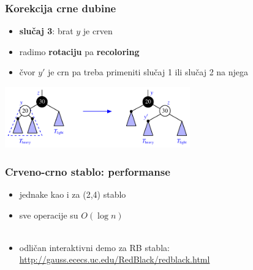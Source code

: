 \documentclass[compress]{beamer}
\begin{document}
\begin{frame}[fragile]
  \frametitle{Korekcija crne dubine}
  \begin{itemize}
    \item \textbf{slučaj 3}: brat $y$ je crven
    \item radimo \textbf{rotaciju} pa \textbf{recoloring}
    \item čvor $y'$ je crn pa treba primeniti slučaj 1 ili slučaj 2 na njega
  \end{itemize}
  \begin{center}
    \includegraphics[width=8cm]{asp-11-pic44.pdf}
  \end{center}
\end{frame}

\begin{frame}[fragile]
  \frametitle{Crveno-crno stablo: performanse}
  \begin{itemize}
    \item jednake kao i za (2,4) stablo
    \item sve operacije su $O(\log n)$ \\ \ \\
    \item odličan interaktivni demo za RB stabla: \\
    \url{http://gauss.ececs.uc.edu/RedBlack/redblack.html}
  \end{itemize}
\end{frame}
\end{document}
